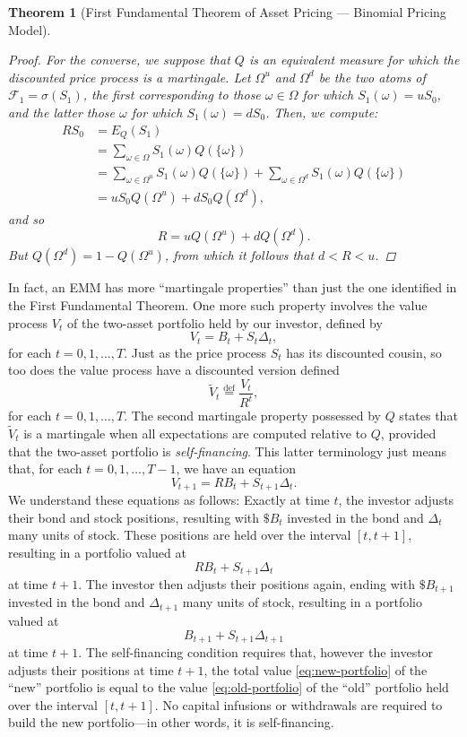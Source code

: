 \documentclass[reqno]{amsart}
\newtheorem{thm}{Theorem}[section]
\theoremstyle{definition}
\numberwithin{equation}{section}
\begin{document}
\begin{thm}[First Fundamental Theorem of Asset Pricing --- Binomial Pricing Model]
\begin{proof}
For the converse, we suppose that $Q$ is an equivalent measure for which the discounted price process is a martingale. Let $\Omega^u$ and $\Omega^d$ be the two atoms of $\mathcal{F}_1 = \sigma(S_1)$, the first corresponding to those $\omega\in \Omega$ for which $S_1(\omega) = uS_0$, and the latter those $\omega$ for which $S_1(\omega) = dS_0$. Then, we compute:
	\begin{align*}
	RS_0 &= E_Q\left(S_1\right) \\
	&= \sum_{\omega\in \Omega} S_1(\omega) Q(\{\omega\}) \\
	&=\sum_{\omega\in \Omega^u} S_1(\omega) Q(\{\omega\}) + \sum_{\omega\in \Omega^d} S_1(\omega) Q(\{\omega\}) \\
	&= uS_0Q(\Omega^u) + dS_0Q(\Omega^d),
	\end{align*}
and so
	\[
	R = uQ(\Omega^u) + dQ(\Omega^d).
	\]
But $Q(\Omega^d) = 1 - Q(\Omega^u)$, from which it follows that $d < R < u$. 
\end{proof}
\end{thm}

In fact, an EMM has more ``martingale properties'' than just the one identified in the First Fundamental Theorem. One more such property involves the value process $V_t$ of the two-asset portfolio held by our investor, defined by
	\[
	V_t = B_t + S_t \Delta_t,
	\]
for each $t=0,1,\ldots,T$. Just as the price process $S_t$ has its discounted cousin, so too does the value process have a discounted version defined
	\[
	\tilde{V}_t \stackrel{\text{def}}{=} \frac{V_t}{R^t},
	\]
for each $t=0,1,\ldots,T$. The second martingale property possessed by $Q$ states that $\tilde{V}_t$ is a martingale when all expectations are computed relative to $Q$, provided that the two-asset portfolio is \textit{self-financing}. This latter terminology just means that, for each $t=0,1,\ldots,T-1$, we have an equation
	\[
	V_{t+1} = RB_t + S_{t+1}\Delta_t.
	\]
We understand these equations as follows: Exactly at time $t$, the investor adjusts their bond and stock positions, resulting with $\$B_t$ invested in the bond and $\Delta_t$ many units of stock. These positions are held over the interval $[t,t+1]$, resulting in a portfolio valued at
	\begin{equation}\label{eq:old-portfolio}
	RB_t + S_{t+1}\Delta_t
	\end{equation}
at time $t+1$. The investor then adjusts their positions again, ending with $\$B_{t+1}$ invested in the bond and $\Delta_{t+1}$ many units of stock, resulting in a portfolio valued at
	\begin{equation}\label{eq:new-portfolio}
	B_{t+1} + S_{t+1} \Delta_{t+1}
	\end{equation}
at time $t+1$. The self-financing condition requires that, however the investor adjusts their positions at time $t+1$, the total value \eqref{eq:new-portfolio} of the ``new'' portfolio is equal to the value \eqref{eq:old-portfolio} of the ``old'' portfolio held over the interval $[t,t+1]$. No capital infusions or withdrawals are required to build the new portfolio---in other words, it is self-financing.
\end{document}
